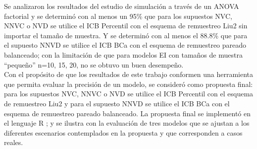 Se analizaron los resultados del estudio de simulación a través de un ANOVA factorial y se determinó con al menos un 95\% que para los supuestos NVC, NNVC o NVD se utilice el ICB Percentil con el esquema de remuestreo Liu2 sin importar el tamaño de muestra. Y se determinó con al menos el 88.8\% que para el supuesto NNVD se utilice el ICB BCa con el esquema de remuestreo pareado balanceado; con la limitación de que para modelos EI con tamaños de muestra “pequeño” n=10, 15, 20, no se obtuvo un buen desempeño. \\


Con el propósito de que los resultados de este trabajo conformen una herramienta que permita evaluar la precisión de un modelo, se consideró como propuesta final: para los supuestos NVC, NNVC o NVD se utilice el ICB Percentil con el esquema de remuestreo Liu2 y para el supuesto NNVD se utilice el ICB BCa con el esquema de remuestreo pareado balanceado. La propuesta final se implementó en el lenguaje R \parencite{R-2024}; y se ilustra con la evaluación de tres modelos que se ajustan a los diferentes escenarios contemplados en la propuesta y que corresponden a casos reales.